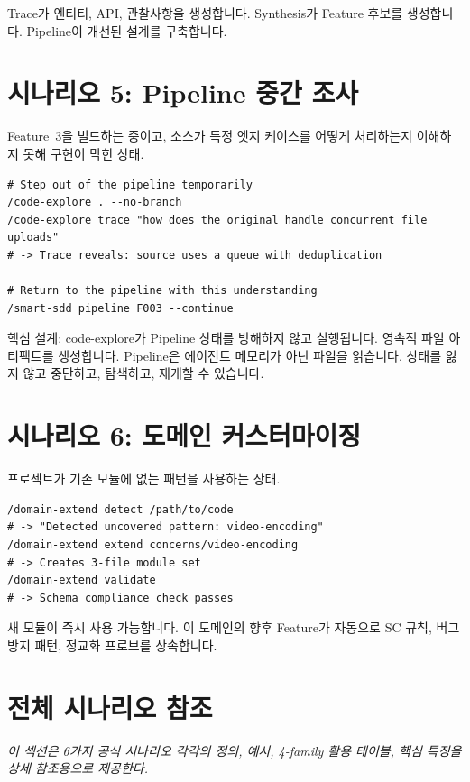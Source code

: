 \documentclass[11pt,a4paper,openright,twoside]{report}
\begin{document}
Trace가 엔티티, API, 관찰사항을 생성합니다. Synthesis가 Feature 후보를 생성합니다. Pipeline이 개선된 설계를 구축합니다.

\section{시나리오 5: Pipeline 중간 조사}

Feature~3을 빌드하는 중이고, 소스가 특정 엣지 케이스를 어떻게 처리하는지 이해하지 못해 구현이 막힌 상태.

\begin{lstlisting}
# Step out of the pipeline temporarily
/code-explore . --no-branch
/code-explore trace "how does the original handle concurrent file uploads"
# -> Trace reveals: source uses a queue with deduplication

# Return to the pipeline with this understanding
/smart-sdd pipeline F003 --continue
\end{lstlisting}

핵심 설계: code-explore가 Pipeline 상태를 방해하지 않고 실행됩니다. 영속적 파일 아티팩트를 생성합니다. Pipeline은 에이전트 메모리가 아닌 파일을 읽습니다. 상태를 잃지 않고 중단하고, 탐색하고, 재개할 수 있습니다.

\section{시나리오 6: 도메인 커스터마이징}

프로젝트가 기존 모듈에 없는 패턴을 사용하는 상태.

\begin{lstlisting}
/domain-extend detect /path/to/code
# -> "Detected uncovered pattern: video-encoding"
/domain-extend extend concerns/video-encoding
# -> Creates 3-file module set
/domain-extend validate
# -> Schema compliance check passes
\end{lstlisting}

새 모듈이 즉시 사용 가능합니다. 이 도메인의 향후 Feature가 자동으로 SC 규칙, 버그 방지 패턴, 정교화 프로브를 상속합니다.


\section{전체 시나리오 참조}
\label{sec:complete-scenario-reference}

\textit{이 섹션은 6가지 공식 시나리오 각각의 정의, 예시, 4-family 활용 테이블, 핵심 특징을 상세 참조용으로 제공한다.}
\end{document}
